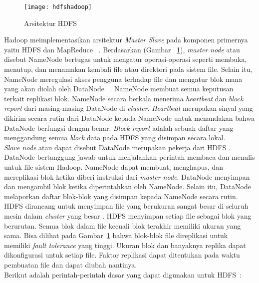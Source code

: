 \begin{figure}[H]
    \centering  
    \texttt{[image: hdfshadoop]}  
    \caption[Arsitektur HDFS]{Arsitektur HDFS} 
    \label{fig:hdfshadoop} 
\end{figure}

Hadoop meimplementasikan arsitektur \textit{Master Slave} pada komponen primernya yaitu HDFS dan MapReduce ~\cite{tomwhite:05:htdg}. Berdasarkan  (Gambar ~\ref{fig:hdfshadoop}), \textit{master} \textit{node} atau disebut NameNode bertugas untuk mengatur operasi-operasi seperti membuka, menutup, dan menamakan kembali file atau direktori pada sistem file. Selain itu, NameNode meregulasi akses pengguna terhadap file dan mengatur blok mana yang akan diolah oleh DataNode ~\cite{tomwhite:05:htdg}. NameNode membuat semua keputusan terkait replikasi blok. NameNode secara berkala menerima \textit{heartbeat} dan \textit{block report} dari masing-masing DataNode di \textit{cluster}. \textit{Heartbeat} merupakan sinyal yang dikirim secara rutin dari DataNode kepada NameNode untuk menandakan bahwa DataNode berfungsi dengan benar. \textit{Block report} adalah sebuah daftar yang menggandung semua \textit{block} data pada HDFS yang disimpan secara lokal.\\
	
\textit{Slave node} atau dapat disebut DataNode merupakan pekerja dari HDFS \cite{tomwhite:05:htdg}. DataNode bertanggung jawab untuk menjalankan perintah membaca dan menulis untuk file sistem Hadoop. NameNode dapat membuat, menghapus, dan mereplikasi blok ketika diberi instruksi dari \textit{master node}. DataNode menyimpan dan mengambil blok ketika diperintahkan oleh NameNode. Selain itu, DataNode melaporkan daftar blok-blok yang disimpan kepada NameNode secara rutin.\\ 

HDFS dirancang untuk menyimpan file yang berukuran sangat besar di seluruh mesin dalam \textit{cluster} yang besar \cite{tomwhite:05:htdg}. HDFS menyimpan setiap file sebagai blok yang berurutan. Semua blok dalam file kecuali blok terakhir memiliki ukuran yang sama. Bisa dilihat pada Gambar~\ref{fig:hdfshadoop} bahwa blok-blok file direplikasi untuk memiliki \textit{fault tolerance} yang tinggi. Ukuran blok dan banyaknya replika dapat dikonfigurasi untuk setiap file. Faktor replikasi dapat ditentukan pada waktu pembuatan file dan dapat diubah nantinya.\\

Berikut adalah perintah-perintah dasar yang dapat digunakan untuk HDFS~\cite{chucklam:06:hia}:

